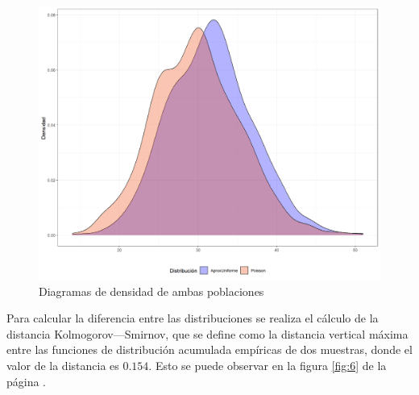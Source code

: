 \documentclass{article}
\begin{document}
\begin{center}
\begin{figure}
\includegraphics[scale=0.6]{figuras/densidadPU.png}
\caption{Diagramas de densidad de ambas poblaciones}
\label{fig:5}
\end{figure}
\end{center}
Para calcular la diferencia entre las distribuciones se realiza el cálculo de la distancia Kolmogorov–--Smirnov, que se define como la distancia vertical máxima entre las funciones de distribución acumulada empíricas de dos muestras, donde el valor de la distancia es $0.154$. Esto se puede observar en la figura \ref{fig:6} de la página \pageref{fig:6}.
\end{document}
